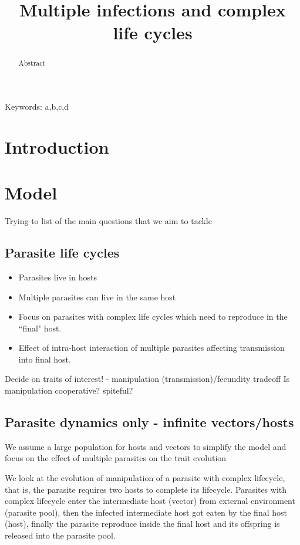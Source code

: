 \documentclass{article}
\title{\vspace*{-22mm}\bf Multiple infections and complex life cycles}
\date{}
\begin{document}
\linenumbers
\maketitle


\begin{abstract}
Abstract
\end{abstract}


\noindent
Keywords: a,b,c,d


\tableofcontents

\section{Introduction}
 

\section{Model}

Trying to list of the main questions that we aim to tackle
\subsection{Parasite life cycles}
\begin{itemize}
	\item Parasites live in hosts
	\item Multiple parasites can live in the same host
	\item Focus on parasites with complex life cycles which need to reproduce in the ``final" host.
	\item Effect of intra-host interaction of multiple parasites affecting transmission into final host. 
\end{itemize}

Decide on traits of interest! - manipulation (transmission)/fecundity tradeoff
Is manipulation cooperative? spiteful?

\subsection{Parasite dynamics only - infinite vectors/hosts}

We assume a large population for hosts and vectors to simplify the model and focus on the effect of multiple parasites on the trait evolution

We look at the evolution of manipulation of a parasite with complex lifecycle, that is, the parasite requires two hosts to complete its lifecycle. Parasites with complex lifecycle enter the intermediate host (vector) from external environment (parasite pool), then the infected intermediate host got eaten by the final host (host), finally the parasite reproduce inside the final host and its offspring is released into the parasite pool.
\end{document}
